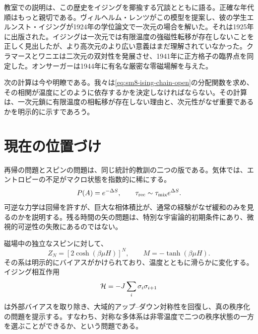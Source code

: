 教室での説明は、この歴史をイジングを揶揄する冗談とともに語る。正確な年代順はもっと親切である。ヴィルヘルム・レンツがこの模型を提案し、彼の学生エルンスト・イジングが1924年の学位論文で一次元の場合を解いた。それは1925年に出版された。イジングは一次元では有限温度の強磁性転移が存在しないことを正しく見出したが、より高次元のより広い意義はまだ理解されていなかった。クラマースとワニエは二次元の双対性を発展させ、1941年に正方格子の臨界点を同定した。オンサーガーは1944年に有名な厳密な零磁場解を与えた。

次の計算は今や明瞭である。我々は\eqref{eq:sm8-ising-chain-open}の分配関数を求め、その相関が温度にどのように依存するかを決定しなければならない。その計算は、一次元鎖に有限温度の相転移が存在しない理由と、次元性がなぜ重要であるかを明示的に示すであろう。

\section{現在の位置づけ}

再帰の問題とスピンの問題は、同じ統計的教訓の二つの版である。気体では、エントロピーの不足がマクロ状態を指数的に稀にする。
\begin{equation}
 P(A)=e^{-\Delta S},
 \qquad
 \tau_{\rm rec}\sim\tau_{\rm mix}e^{\Delta S}.
 \label{eq:sm8-summary-recurrence}
\end{equation}
可逆な力学は回帰を許すが、巨大な相体積比が、通常の経験がなぜ緩和のみを見るのかを説明する。残る時間の矢の問題は、特別な宇宙論的初期条件にあり、微視的可逆性の失敗にあるのではない。

磁場中の独立なスピンに対して、
\begin{equation}
 Z_N=\left[2\cosh(\beta\mu H)\right]^N,
 \qquad
 M=-\tanh(\beta\mu H).
 \label{eq:sm8-summary-spins}
\end{equation}
その系は明示的にバイアスがかけられており、温度とともに滑らかに変化する。イジング相互作用
\begin{equation}
 {\cal H}=-J\sum_i\sigma_i\sigma_{i+1}
 \label{eq:sm8-summary-ising}
\end{equation}
は外部バイアスを取り除き、大域的アップ--ダウン対称性を回復し、真の秩序化の問題を提示する。すなわち、対称な多体系は非零温度で二つの秩序状態の一方を選ぶことができるか、という問題である。